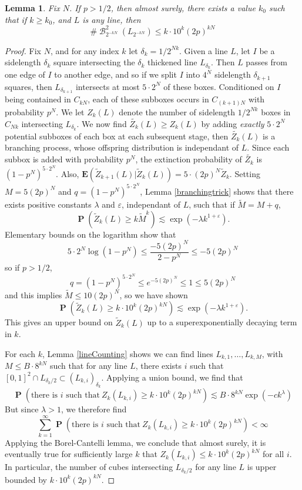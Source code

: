 \documentclass[dvipsnames,letterpaper,12pt]{article}
\numberwithin{equation}{section}
\theoremstyle{plain}
\newtheorem{lemma}{Lemma}
\DeclareMathOperator{\Prob}{\mathbf{P}}
\DeclareMathOperator{\B}{\mathcal{B}}
\begin{document}
\begin{lemma} \label{lineBounding}
	Fix $N$. If $p > 1/2$, then almost surely, there exists a value $k_0$ such that if $k \geq k_0$, and $L$ is any line, then
	\[ \# \B^2_{2^{-kN}}(L_{2^{-kN}}) \leq k \cdot 10^k (2p)^{kN} \]
\end{lemma}
\begin{proof}
	Fix $N$, and for any index $k$ let $\delta_k = 1/2^{Nk}$. Given a line $L$, let $I$ be a sidelength $\delta_k$ square intersecting the $\delta_k$ thickened line $L_{\delta_k}$. Then $L$ passes from one edge of $I$ to another edge, and so if we split $I$ into $4^N$ sidelength $\delta_{k+1}$ squares, then $L_{\delta_{k+1}}$ intersects at most $5 \cdot 2^N$ of these boxes. Conditioned on $I$ being contained in $C_{kN}$, each of these subboxes occurs in $C_{(k+1)N}$ with probability $p^N$. We let $Z_k(L)$ denote the number of sidelength $1/2^{Nk}$ boxes in $C_{Nk}$ intersecting $L_{\delta_k}$. We now find $\tilde{Z_k}(L) \geq Z_k(L)$ by adding {\it exactly} $5 \cdot 2^N$ potential subboxes of each box at each subsequent stage, then $\tilde{Z_k}(L)$ is a branching process, whose offspring distribution is independant of $L$. Since each subbox is added with probability $p^N$, the extinction probability of $\tilde{Z_k}$ is $(1 - p^N)^{5 \cdot 2^N}$. Also, $\mathbf{E}(\tilde{Z}_{k+1}(L)|\tilde{Z}_k(L)) = 5 \cdot (2p)^N \tilde{Z}_k$.  Setting $M = 5 (2p)^N$ and $q = (1 - p^N)^{5 \cdot 2^N}$, Lemma \ref{branchingtrick} shows that there exists positive constants $\lambda$ and $\varepsilon$, independant of $L$, such that if $\tilde{M} = M + q$,
	\[ \Prob \left( \tilde{Z}_k(L) \geq k \tilde{M}^k \right) \lesssim \exp(- \lambda k^{1 + \varepsilon}). \]
	Elementary bounds on the logarithm show that
	\[ 5 \cdot 2^N \log(1 - p^N) \leq \frac{-5 (2p)^N}{2 - p^N} \leq -5(2p)^N \]
	so if $p > 1/2$,
	\[ q = (1 - p^N)^{5 \cdot 2^N} \leq e^{-5 (2p)^N} \leq 1 \leq 5(2p)^N \]
	and this implies $\tilde{M} \leq 10 (2p)^N$, so we have shown
	\[ \Prob ( \tilde{Z}_k(L) \geq k \cdot 10^k (2p)^{kN}) \lesssim \exp( - \lambda k^{1 + \varepsilon}). \]
	This gives an upper bound on $\tilde{Z}_k(L)$ up to a superexponentially decaying term in $k$.

	For each $k$, Lemma \ref{lineCounting} shows we can find lines $L_{k,1}, \dots, L_{k,M}$, with $M \leq B \cdot 8^{kN}$ such that for any line $L$, there exists $i$ such that $[0,1]^2 \cap L_{\delta_k/2} \subset (L_{k,i})_{\delta_k}$. Applying a union bound, we find that
	\[ \Prob \left( \text{there is $i$ such that}\ Z_k(L_{k,i}) \geq k \cdot 10^k (2p)^{kN} \right) \lesssim B \cdot 8^{kN} \exp(-c k^\lambda) \]
	But since $\lambda > 1$, we therefore find
	\[ \sum_{k = 1}^\infty \Prob \left( \text{there is $i$ such that}\ Z_k(L_{k,i}) \geq k \cdot 10^k (2p)^{kN} \right) < \infty \]
	Applying the Borel-Cantelli lemma, we conclude that almost surely, it is eventually true for sufficiently large $k$ that $Z_k(L_{k,i}) \leq k \cdot 10^k (2p)^{kN}$ for all $i$. In particular, the number of cubes intersecting $L_{\delta_k/2}$ for any line $L$ is upper bounded by $k \cdot 10^k (2p)^{kN}$.
\end{proof}
\end{document}
